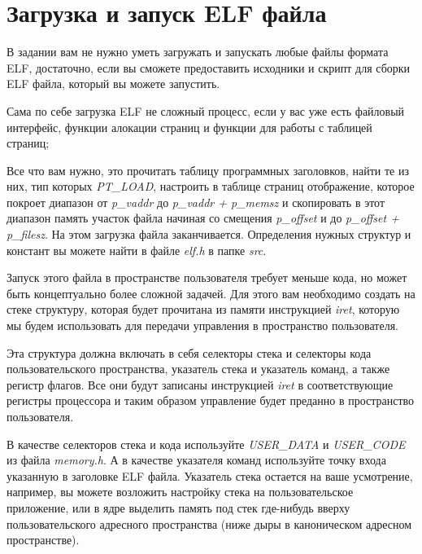 \section{Загрузка и запуск ELF файла}

В задании вам не нужно уметь загружать и запускать любые файлы формата ELF,
достаточно, если вы сможете предоставить исходники и скрипт для сборки ELF
файла, который вы можете запустить.

Сама по себе загрузка ELF не сложный процесс, если у вас уже есть файловый
интерфейс, функции алокации страниц и функции для работы с таблицей
страниц;

Все что вам нужно, это прочитать таблицу программных заголовков, найти те
из них, тип которых \emph{PT\_LOAD}, настроить в таблице страниц отображение,
которое покроет диапазон от \emph{p\_vaddr} до \emph{p\_vaddr + p\_memsz} и
скопировать в этот диапазон память участок файла начиная со смещения
\emph{p\_offset} и до \emph{p\_offset + p\_filesz}. На этом загрузка файла
заканчивается. Определения нужных структур и констант вы можете найти в файле
\emph{elf.h} в папке \emph{src}.

Запуск этого файла в пространстве пользователя требует меньше кода, но
может быть концептуально более сложной задачей. Для этого вам необходимо
создать на стеке структуру, которая будет прочитана из памяти инструкцией
\emph{iret}, которую мы будем использовать для передачи управления в
пространство пользователя.

Эта структура должна включать в себя селекторы стека и селекторы кода
пользовательского пространства, указатель стека и указатель команд, а также
регистр флагов. Все они будут записаны инструкцией \emph{iret} в
соответствующие регистры процессора и таким образом управление будет
преданно в пространство пользователя.

В качестве селекторов стека и кода используйте \emph{USER\_DATA} и
\emph{USER\_CODE} из файла \emph{memory.h}. А в качестве указателя команд
используйте точку входа указанную в заголовке ELF файла. Указатель стека
остается на ваше усмотрение, например, вы можете возложить настройку стека
на пользовательское приложение, или в ядре выделить память под стек где-нибудь
вверху пользовательского адресного пространства (ниже дыры в каноническом
адресном пространстве).
